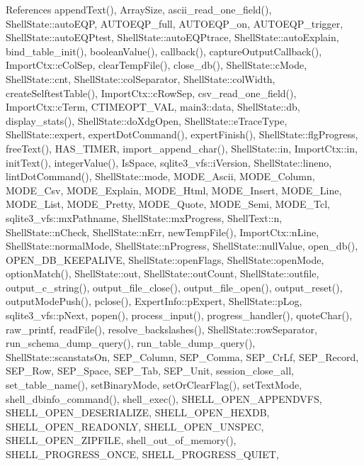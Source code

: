 References append\+Text(), Array\+Size, ascii\+\_\+read\+\_\+one\+\_\+field(), Shell\+State\+::auto\+E\+QP, A\+U\+T\+O\+E\+Q\+P\+\_\+full, A\+U\+T\+O\+E\+Q\+P\+\_\+on, A\+U\+T\+O\+E\+Q\+P\+\_\+trigger, Shell\+State\+::auto\+E\+Q\+Ptest, Shell\+State\+::auto\+E\+Q\+Ptrace, Shell\+State\+::auto\+Explain, bind\+\_\+table\+\_\+init(), boolean\+Value(), callback(), capture\+Output\+Callback(), Import\+Ctx\+::c\+Col\+Sep, clear\+Temp\+File(), close\+\_\+db(), Shell\+State\+::c\+Mode, Shell\+State\+::cnt, Shell\+State\+::col\+Separator, Shell\+State\+::col\+Width, create\+Selftest\+Table(), Import\+Ctx\+::c\+Row\+Sep, csv\+\_\+read\+\_\+one\+\_\+field(), Import\+Ctx\+::c\+Term, C\+T\+I\+M\+E\+O\+P\+T\+\_\+\+V\+AL, main3\+::data, Shell\+State\+::db, display\+\_\+stats(), Shell\+State\+::do\+Xdg\+Open, Shell\+State\+::e\+Trace\+Type, Shell\+State\+::expert, expert\+Dot\+Command(), expert\+Finish(), Shell\+State\+::flg\+Progress, free\+Text(), H\+A\+S\+\_\+\+T\+I\+M\+ER, import\+\_\+append\+\_\+char(), Shell\+State\+::in, Import\+Ctx\+::in, init\+Text(), integer\+Value(), Is\+Space, sqlite3\+\_\+vfs\+::i\+Version, Shell\+State\+::lineno, lint\+Dot\+Command(), Shell\+State\+::mode, M\+O\+D\+E\+\_\+\+Ascii, M\+O\+D\+E\+\_\+\+Column, M\+O\+D\+E\+\_\+\+Csv, M\+O\+D\+E\+\_\+\+Explain, M\+O\+D\+E\+\_\+\+Html, M\+O\+D\+E\+\_\+\+Insert, M\+O\+D\+E\+\_\+\+Line, M\+O\+D\+E\+\_\+\+List, M\+O\+D\+E\+\_\+\+Pretty, M\+O\+D\+E\+\_\+\+Quote, M\+O\+D\+E\+\_\+\+Semi, M\+O\+D\+E\+\_\+\+Tcl, sqlite3\+\_\+vfs\+::mx\+Pathname, Shell\+State\+::mx\+Progress, Shell\+Text\+::n, Shell\+State\+::n\+Check, Shell\+State\+::n\+Err, new\+Temp\+File(), Import\+Ctx\+::n\+Line, Shell\+State\+::normal\+Mode, Shell\+State\+::n\+Progress, Shell\+State\+::null\+Value, open\+\_\+db(), O\+P\+E\+N\+\_\+\+D\+B\+\_\+\+K\+E\+E\+P\+A\+L\+I\+VE, Shell\+State\+::open\+Flags, Shell\+State\+::open\+Mode, option\+Match(), Shell\+State\+::out, Shell\+State\+::out\+Count, Shell\+State\+::outfile, output\+\_\+c\+\_\+string(), output\+\_\+file\+\_\+close(), output\+\_\+file\+\_\+open(), output\+\_\+reset(), output\+Mode\+Push(), pclose(), Expert\+Info\+::p\+Expert, Shell\+State\+::p\+Log, sqlite3\+\_\+vfs\+::p\+Next, popen(), process\+\_\+input(), progress\+\_\+handler(), quote\+Char(), raw\+\_\+printf, read\+File(), resolve\+\_\+backslashes(), Shell\+State\+::row\+Separator, run\+\_\+schema\+\_\+dump\+\_\+query(), run\+\_\+table\+\_\+dump\+\_\+query(), Shell\+State\+::scanstats\+On, S\+E\+P\+\_\+\+Column, S\+E\+P\+\_\+\+Comma, S\+E\+P\+\_\+\+Cr\+Lf, S\+E\+P\+\_\+\+Record, S\+E\+P\+\_\+\+Row, S\+E\+P\+\_\+\+Space, S\+E\+P\+\_\+\+Tab, S\+E\+P\+\_\+\+Unit, session\+\_\+close\+\_\+all, set\+\_\+table\+\_\+name(), set\+Binary\+Mode, set\+Or\+Clear\+Flag(), set\+Text\+Mode, shell\+\_\+dbinfo\+\_\+command(), shell\+\_\+exec(), S\+H\+E\+L\+L\+\_\+\+O\+P\+E\+N\+\_\+\+A\+P\+P\+E\+N\+D\+V\+FS, S\+H\+E\+L\+L\+\_\+\+O\+P\+E\+N\+\_\+\+D\+E\+S\+E\+R\+I\+A\+L\+I\+ZE, S\+H\+E\+L\+L\+\_\+\+O\+P\+E\+N\+\_\+\+H\+E\+X\+DB, S\+H\+E\+L\+L\+\_\+\+O\+P\+E\+N\+\_\+\+R\+E\+A\+D\+O\+N\+LY, S\+H\+E\+L\+L\+\_\+\+O\+P\+E\+N\+\_\+\+U\+N\+S\+P\+EC, S\+H\+E\+L\+L\+\_\+\+O\+P\+E\+N\+\_\+\+Z\+I\+P\+F\+I\+LE, shell\+\_\+out\+\_\+of\+\_\+memory(), S\+H\+E\+L\+L\+\_\+\+P\+R\+O\+G\+R\+E\+S\+S\+\_\+\+O\+N\+CE, S\+H\+E\+L\+L\+\_\+\+P\+R\+O\+G\+R\+E\+S\+S\+\_\+\+Q\+U\+I\+ET, 